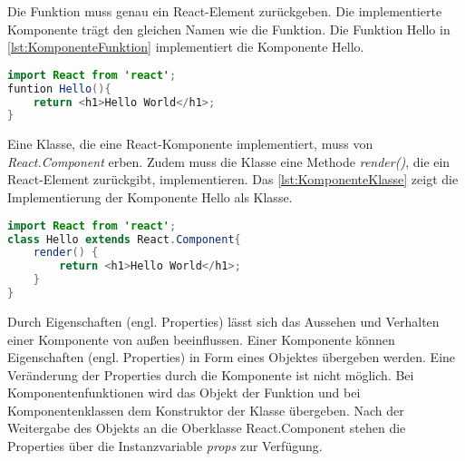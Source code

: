 Die Funktion muss genau ein React-Element zurückgeben. Die implementierte Komponente trägt den gleichen Namen wie die Funktion. Die Funktion Hello in \autoref{lst:KomponenteFunktion} implementiert die Komponente Hello.

\begin{lstlisting}[caption=Beispiel einer Komponente als Funktion, label=lst:KomponenteFunktion, language=Java]
import React from 'react';
funtion Hello(){
	return <h1>Hello World</h1>;
}
\end{lstlisting}

Eine Klasse, die eine React-Komponente implementiert, muss von \textit{React.Component} erben. Zudem muss die Klasse eine Methode \textit{render()}, die ein React-Element zurückgibt, implementieren. Das \autoref{lst:KomponenteKlasse} zeigt die Implementierung der Komponente Hello als Klasse.\autocite[vgl.][80\psqq]{Zeigermann.2016}

\begin{lstlisting}[caption=Beispiel einer Komponente als Klasse, label=lst:KomponenteKlasse, language=Java]
import React from 'react';
class Hello extends React.Component{
	render() {
		return <h1>Hello World</h1>;
	}
}
\end{lstlisting}

Durch Eigenschaften (engl. Properties) lässt sich das Aussehen und Verhalten einer Komponente von außen beeinflussen. Einer Komponente können Eigenschaften (engl. Properties) in Form eines Objektes übergeben werden. Eine Veränderung der Properties durch die Komponente ist nicht möglich. Bei Komponentenfunktionen wird das Objekt der Funktion und bei Komponentenklassen dem Konstruktor der Klasse übergeben. Nach der Weitergabe des Objekts an die Oberklasse React.Component stehen die Properties über die Instanzvariable \textit{props} zur Verfügung. \autocites[vgl.][24\psq,83-88]{Zeigermann.2016}[vgl.][12-17]{Stefanov.2017}



